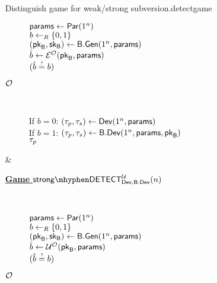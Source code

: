 \begin{defn}
\begin{enumerate}[1.]
\begin{boxfigTwo}{Distinguish game for weak/strong subversion.}{detectgame}
\begin{minipage}{0.45\textwidth}
\begin{description}
 		$\mathsf{params}\leftarrow\operatorname{\mathsf{Par}}(1^n)$ \\
 		$b\leftarrow_R\left\{0,1\right\}$ \\
 		$(\mathsf{pk}_{\mathsf{B}},\mathsf{sk}_{\mathsf{B}})\leftarrow \mathsf{B}.\mathsf{Gen}(1^n,\mathsf{params})$  \\
 		$\hat{b}\leftarrow \mathcal{E}^{\operatorname{\mathcal{O}}}(\mathsf{pk}_{\mathsf{B}},\mathsf{params})$ \\
 		\Ret $\askequal{\hat{b}}{b}$

	\item[\underline{$\operatorname{\mathcal{O}}$}] ~
	
		If $b=0$: $(\tau_p,\tau_s)\leftarrow \operatorname{\mathsf{Dev}}(1^n,\mathsf{params})$\\
		If $b=1$: $(\tau_p,\tau_s)\leftarrow \mathsf{B}.\mathsf{Dev}(1^n,\mathsf{params},\mathsf{pk}_{\mathsf{B}})$ \\
		\Ret $\tau_p$
		\smallskip
  	\end{description}
\end{minipage}
    & 
\begin{minipage}{0.45\textwidth}
    \smallskip
	\begin{description}
 	\item[\underline{\textbf{Game} $\strongdetect{\dev}{\bbdev}{\user}$}] ~
 	
 		$\mathsf{params}\leftarrow\operatorname{\mathsf{Par}}(1^n)$ \\
 		$b\leftarrow_R\left\{0,1\right\}$ \\
 		$(\mathsf{pk}_{\mathsf{B}},\mathsf{sk}_{\mathsf{B}})\leftarrow \mathsf{B}.\mathsf{Gen}(1^n,\mathsf{params})$  \\
 		$\hat{b}\leftarrow \mathcal{U}^{\operatorname{\mathcal{O}}}(\mathsf{pk}_{\mathsf{B}},\mathsf{params})$ \\
 		\Ret $\askequal{\hat{b}}{b}$

	\item[\underline{$\operatorname{\mathcal{O}}$}] ~
	

\end{description}
\end{minipage}
\end{boxfigTwo}
\end{enumerate}
\end{defn}
